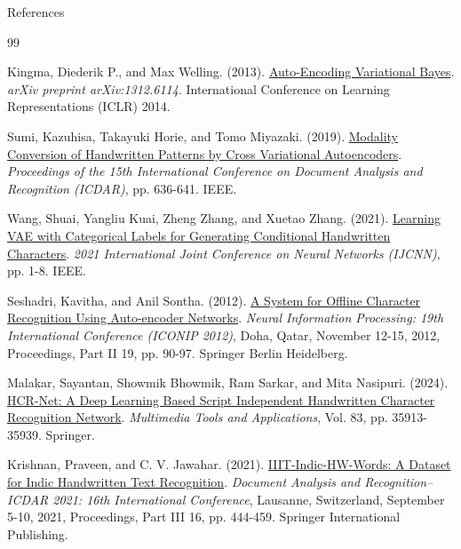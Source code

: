 \documentclass[aspectratio=169, 12pt]{beamer}
\begin{document}
\begin{frame}[allowframebreaks]{References}
    \small
    \begin{thebibliography}{99}
        
        Kingma, Diederik P., and Max Welling. (2013).
        \newblock \href{https://arxiv.org/abs/1312.6114}{Auto-Encoding Variational Bayes}.
        \newblock \textit{arXiv preprint arXiv:1312.6114}. International Conference on Learning Representations (ICLR) 2014.
        
        Sumi, Kazuhisa, Takayuki Horie, and Tomo Miyazaki. (2019).
        \newblock \href{https://arxiv.org/abs/1906.06142}{Modality Conversion of Handwritten Patterns by Cross Variational Autoencoders}.
        \newblock \textit{Proceedings of the 15th International Conference on Document Analysis and Recognition (ICDAR)}, pp. 636-641. IEEE.
        
        Wang, Shuai, Yangliu Kuai, Zheng Zhang, and Xuetao Zhang. (2021).
        \newblock \href{https://ieeexplore.ieee.org/document/9511404}{Learning VAE with Categorical Labels for Generating Conditional Handwritten Characters}.
        \newblock \textit{2021 International Joint Conference on Neural Networks (IJCNN)}, pp. 1-8. IEEE.
        
        Seshadri, Kavitha, and Anil Sontha. (2012).
        \newblock \href{https://link.springer.com/chapter/10.1007/978-3-642-34478-7_12}{A System for Offline Character Recognition Using Auto-encoder Networks}.
        \newblock \textit{Neural Information Processing: 19th International Conference (ICONIP 2012)}, Doha, Qatar, November 12-15, 2012, Proceedings, Part II 19, pp. 90-97. Springer Berlin Heidelberg.
        
        \framebreak
        
        Malakar, Sayantan, Showmik Bhowmik, Ram Sarkar, and Mita Nasipuri. (2024).
        \newblock \href{https://link.springer.com/article/10.1007/s11042-024-18655-5}{HCR-Net: A Deep Learning Based Script Independent Handwritten Character Recognition Network}.
        \newblock \textit{Multimedia Tools and Applications}, Vol. 83, pp. 35913-35939. Springer.
        
        Krishnan, Praveen, and C. V. Jawahar. (2021).
        \newblock \href{https://link.springer.com/chapter/10.1007/978-3-030-86337-1_30}{IIIT-Indic-HW-Words: A Dataset for Indic Handwritten Text Recognition}.
        \newblock \textit{Document Analysis and Recognition–ICDAR 2021: 16th International Conference}, Lausanne, Switzerland, September 5-10, 2021, Proceedings, Part III 16, pp. 444-459. Springer International Publishing.
        

\end{thebibliography}
\end{frame}
\end{document}

